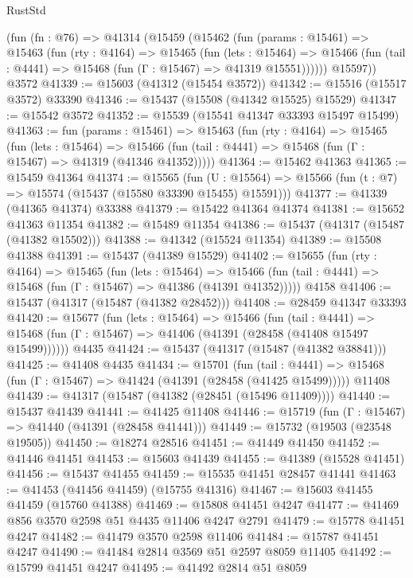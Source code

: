 \begin{lexlean}{RustStd}
\begin{coremodule}
    (fun (fn : @76) =>
    @41314
      (@15459
        (@15462
          (fun (params : @15461) =>
          @15463
            (fun (rty : @4164) =>
            @15465
              (fun (lets : @15464) =>
              @15466 (fun (tail : @4441) => @15468 (fun (Γ : @15467) => @41319 @15551))))))
        @15597))
    @3572
@41339 := @15603 (@41312 (@15454 @3572))
@41342 := @15516 (@15517 @3572) @33390
@41346 := @15437 (@15508 (@41342 @15525) @15529)
@41347 := @15542 @3572
@41352 := @15539 (@15541 @41347 @33393 @15497 @15499)
@41363 := fun (params : @15461) =>
  @15463
    (fun (rty : @4164) =>
    @15465
      (fun (lets : @15464) =>
      @15466 (fun (tail : @4441) => @15468 (fun (Γ : @15467) => @41319 (@41346 @41352)))))
@41364 := @15462 @41363
@41365 := @15459 @41364
@41374 := @15565
    (fun (U : @15564) => @15566 (fun (t : @7) => @15574 (@15437 (@15580 @33390 @15455) @15591)))
@41377 := @41339 (@41365 @41374) @33388
@41379 := @15422 @41364 @41374
@41381 := @15652 @41363 @11354
@41382 := @15489 @11354
@41386 := @15437 (@41317 (@15487 (@41382 @15502)))
@41388 := @41342 (@15524 @11354)
@41389 := @15508 @41388
@41391 := @15437 (@41389 @15529)
@41402 := @15655
    (fun (rty : @4164) =>
    @15465
      (fun (lets : @15464) =>
      @15466 (fun (tail : @4441) => @15468 (fun (Γ : @15467) => @41386 (@41391 @41352)))))
    @4158
@41406 := @15437 (@41317 (@15487 (@41382 @28452)))
@41408 := @28459 @41347 @33393
@41420 := @15677
    (fun (lets : @15464) =>
    @15466
      (fun (tail : @4441) =>
      @15468 (fun (Γ : @15467) => @41406 (@41391 (@28458 (@41408 @15497 @15499))))))
    @4435
@41424 := @15437 (@41317 (@15487 (@41382 @38841)))
@41425 := @41408 @4435
@41434 := @15701
    (fun (tail : @4441) => @15468 (fun (Γ : @15467) => @41424 (@41391 (@28458 (@41425 @15499)))))
    @11408
@41439 := @41317 (@15487 (@41382 (@28451 (@15496 @11409))))
@41440 := @15437 @41439
@41441 := @41425 @11408
@41446 := @15719 (fun (Γ : @15467) => @41440 (@41391 (@28458 @41441)))
@41449 := @15732 (@19503 (@23548 @19505))
@41450 := @18274 @28516
@41451 := @41449 @41450
@41452 := @41446 @41451
@41453 := @15603 @41439
@41455 := @41389 (@15528 @41451)
@41456 := @15437 @41455
@41459 := @15535 @41451 @28457 @41441
@41463 := @41453 (@41456 @41459) (@15755 @41316)
@41467 := @15603 @41455 @41459 (@15760 @41388)
@41469 := @15808 @41451 @4247
@41477 := @41469 @856 @3570 @2598 @51 @4435 @11406 @4247 @2791
@41479 := @15778 @41451 @4247
@41482 := @41479 @3570 @2598 @11406
@41484 := @15787 @41451 @4247
@41490 := @41484 @2814 @3569 @51 @2597 @8059 @11405
@41492 := @15799 @41451 @4247
@41495 := @41492 @2814 @51 @8059

\end{coremodule}
\end{lexlean}
